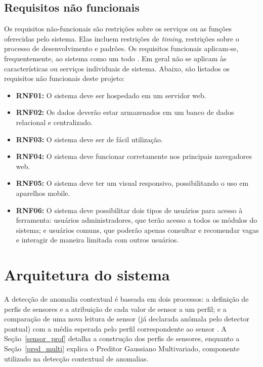 \documentclass[cic,tc]{iiufrgs}
\begin{document}
\subsection{Requisitos não funcionais}
\label{requisitosRNF}
Os requisitos não-funcionais são restrições sobre os serviços ou as funções oferecidas pelo sistema. Elas incluem restrições de \textit{timing}, restrições sobre o processo de desenvolvimento e padrões. Os requisitos funcionais aplicam-se, frequentemente, ao sistema como um todo \cite{sommerville}. Em geral não se aplicam às características ou serviços individuais de sistema. Abaixo, são listados os requisitos não funcionais deste projeto:  

\begin{itemize}
    \item \textbf{RNF01:} O sistema deve ser hospedado em um servidor web.

    \item \textbf{RNF02:} Os dados deverão estar armazenados em um banco de dados relacional e centralizado.  

    \item \textbf{RNF03:} O sistema deve ser de fácil utilização.  

    \item \textbf{RNF04:} O sistema deve funcionar corretamente nos principais navegadores web.

    \item \textbf{RNF05:} O sistema deve ter um visual responsivo, possibilitando o uso em aparelhos mobile.

    \item \textbf{RNF06:} O sistema deve possibilitar dois tipos de usuários para acesso à ferramenta: usuários administradores, que terão acesso a todos os módulos do sistema; e usuários comuns, que poderão apenas consultar e recomendar vagas e interagir de maneira limitada com outros usuários.
\end{itemize}

\section{Arquitetura do sistema}
\label{metodologiaArquitetura}
A detecção de anomalia contextual é baseada em dois processos: a definição de perfis de sensores e a atribuição de cada valor de sensor a um perfil; e a comparação de uma nova leitura de sensor (já declarada anômala pelo detector pontual) com a média esperada pelo perfil correspondente ao sensor \cite{ContextualMichael2014}. A Seção~\ref{sensor_prof} detalha a construção dos perfis de sensores, enquanto a Seção~\ref{pred_multi} explica o Preditor Gaussiano Multivariado, componente utilizado na detecção contextual de anomalias.
\end{document}
